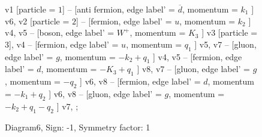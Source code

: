 \documentclass{revtex4}
\begin{document}
\begin{figure}[!htb]
\begin{center}
{    %
v1 [particle = \(1\)] -- [anti fermion, edge label' = \(\overline{d}\), momentum = \(k_{1}\) ] v6, 
v2 [particle = \(2\)] -- [fermion, edge label' = \(u\), momentum = \(k_{2}\) ] v4, 
v5 -- [boson, edge label' = \(W^{+}\), momentum = \(K_{3}\) ] v3 [particle = \(3\)], 
v4 -- [fermion, edge label' = \(u\), momentum = \(q_{1}\) ] v5, 
v7 -- [gluon, edge label' = \(g\), momentum = \(-k_{2} + q_{1}\) ] v4, 
v5 -- [fermion, edge label' = \(d\), momentum = \(-K_{3} + q_{1}\) ] v8, 
v7 -- [gluon, edge label' = \(g\), momentum = \(-q_{2}\) ] v6, 
v8 -- [fermion, edge label' = \(d\), momentum = \(-k_{1} + q_{2}\) ] v6, 
v8 -- [gluon, edge label' = \(g\), momentum = \(-k_{2} + q_{1} - q_{2}\) ] v7, 
};
\end{center}
\caption{Diagram6, Sign: -1, Symmetry factor: 1}
\end{figure}
\newpage
\end{document}
